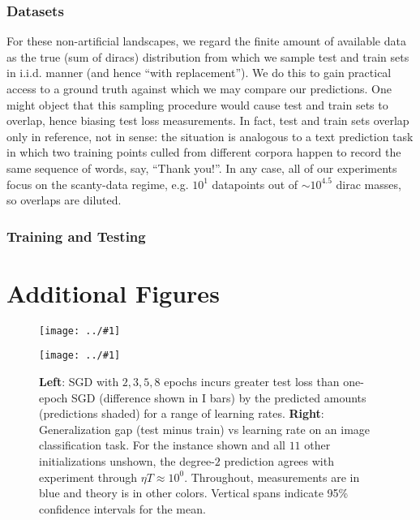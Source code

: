 \documentclass{article}
\theoremstyle{plain}
\theoremstyle{definition}
\newcommand{\plotmoo}[3]{
    \texttt{[image: ../\#1]}
}
\begin{document}
        \subsubsection*{Datasets}
            For these non-artificial landscapes, we regard the finite amount of
            available data as the true (sum of diracs) distribution from which we
            sample test and train sets in i.i.d.  manner (and hence ``with
            replacement'').  We do this to gain practical access to a ground truth
            against which we may compare our predictions.  One might object that
            this sampling procedure would cause test and train sets to overlap,
            hence biasing test loss measurements.  In fact, test and train sets
            overlap only in reference, not in sense: the situation is analogous to
            a text prediction task in which two training points culled from
            different corpora happen to record the same sequence of words, say,
            ``Thank you!''.  In any case, all of our experiments focus on the
            scanty-data regime, e.g. $10^1$ datapoints out of $\sim 10^{4.5}$ dirac
            masses, so overlaps are diluted. 

        \subsubsection*{Training and Testing}

\section{Additional Figures}\label{sect:figures}

    \begin{figure}[h]
        \centering
        \plotmoo{plots/multi-fashion-logistic-0}{0.48\columnwidth}{4.0cm}
        \plotmoo{plots/gen-cifar}{0.48\columnwidth}{3.0cm}
        \caption{
            {\bf Left}: SGD with $2, 3, 5, 8$ epochs incurs greater test
            loss than one-epoch SGD (difference shown in I bars) by the
            predicted amounts (predictions shaded) for a range of learning
            rates.
            {\bf Right}:
            Generalization gap (test minus train) vs learning rate on an
            image classification task.  For the instance shown and all $11$
            other initializations unshown, the degree-$2$ prediction agrees
            with experiment through $\eta T \approx 10^0$.  Throughout,
            measurements are in blue and theory is in other colors.
            Vertical spans indicate 95\% confidence intervals for the mean.
        }
        \label{fig:multiandgen}
    \end{figure}
\end{document}
